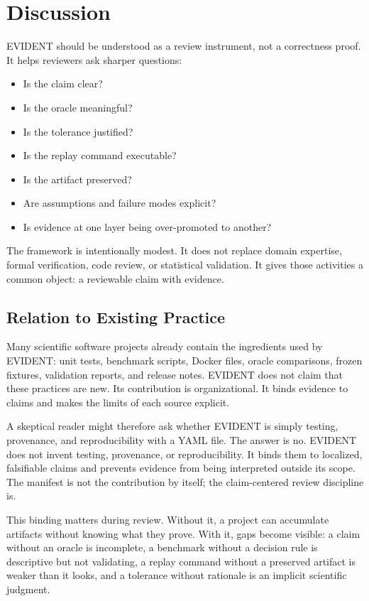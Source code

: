 \documentclass[10pt,twoside]{article}
\newcounter{note}
\begin{document}
\section{Discussion}

EVIDENT should be understood as a review instrument, not a correctness proof.
It helps reviewers ask sharper questions:

\begin{itemize}[leftmargin=*]
  \item Is the claim clear?
  \item Is the oracle meaningful?
  \item Is the tolerance justified?
  \item Is the replay command executable?
  \item Is the artifact preserved?
  \item Are assumptions and failure modes explicit?
  \item Is evidence at one layer being over-promoted to another?
\end{itemize}

The framework is intentionally modest. It does not replace domain expertise,
formal verification, code review, or statistical validation. It gives those
activities a common object: a reviewable claim with evidence.

\subsection{Relation to Existing Practice}

Many scientific software projects already contain the ingredients used by
EVIDENT:
unit tests, benchmark scripts, Docker files, oracle comparisons, frozen
fixtures, validation reports, and release notes. EVIDENT does not claim that
these practices are new. Its contribution is organizational. It binds evidence
to claims and makes the limits of each source explicit.

A skeptical reader might therefore ask whether EVIDENT is simply testing,
provenance, and reproducibility with a YAML file. The answer is no. EVIDENT
does not invent testing, provenance, or reproducibility. It binds them to
localized, falsifiable claims and prevents evidence from being interpreted
outside its scope. The manifest is not the contribution by itself; the
claim-centered review discipline is.

This binding matters during review. Without it, a project can accumulate
artifacts without knowing what they prove. With it, gaps become visible: a
claim without an oracle is incomplete, a benchmark without a decision rule is
descriptive but not validating, a replay command without a preserved artifact
is weaker than it looks, and a tolerance without rationale is an implicit
scientific judgment.
\end{document}
